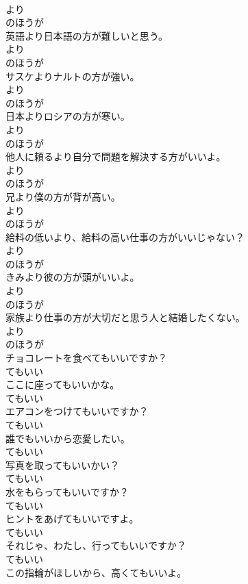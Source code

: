 \documentclass[8pt]{extreport}
\begin{document}
\begin{CJK}{UTF8}{min}
\\	より 
\\	のほうが 
\\	英語より日本語の方が難しいと思う。	
\\	より 
\\	のほうが 
\\	サスケよりナルトの方が強い。	
\\	より 
\\	のほうが 
\\	日本よりロシアの方が寒い。	
\\	より 
\\	のほうが 
\\	他人に頼るより自分で問題を解決する方がいいよ。	
\\	より 
\\	のほうが 
\\	兄より僕の方が背が高い。	
\\	より 
\\	のほうが 
\\	給料の低いより、給料の高い仕事の方がいいじゃない？	
\\	より 
\\	のほうが 
\\	きみより彼の方が頭がいいよ。	
\\	より 
\\	のほうが 
\\	家族より仕事の方が大切だと思う人と結婚したくない。	
\\	より 
\\	のほうが 
\\	チョコレートを食べてもいいですか？	
\\	てもいい
\\	ここに座ってもいいかな。	
\\	てもいい
\\	エアコンをつけてもいいですか？	
\\	てもいい
\\	誰でもいいから恋愛したい。	
\\	てもいい
\\	写真を取ってもいいかい？	
\\	てもいい
\\	水をもらってもいいですか？	
\\	てもいい
\\	ヒントをあげてもいいですよ。	
\\	てもいい
\\	それじゃ、わたし、行ってもいいですか？	
\\	てもいい
\\	この指輪がほしいから、高くてもいいよ。	

\end{CJK}
\end{document}
